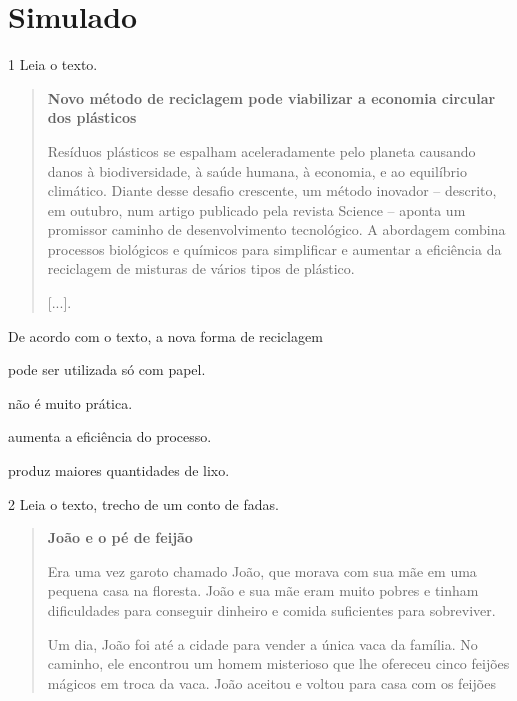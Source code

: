 \pagestyle{simu}
\setcounter{chapter}{0}
\chapter[Simulado 1]{Simulado}

\num{1} Leia o texto.

\begin{quote}
\textbf{Novo método de reciclagem pode viabilizar a economia circular dos plásticos}

Resíduos plásticos se espalham aceleradamente pelo planeta causando
danos à biodiversidade, à saúde humana, à economia, e ao equilíbrio
climático. Diante desse desafio crescente, um método inovador –
descrito, em outubro, num artigo publicado pela revista Science –
aponta um promissor caminho de desenvolvimento tecnológico. A abordagem
combina processos biológicos e químicos para simplificar e aumentar a
eficiência da reciclagem de misturas de vários tipos de plástico.

{[}...{]}.

\end{quote}

De acordo com o texto, a nova forma de reciclagem

\begin{minipage}{.5\textwidth}
\begin{escolha}
\item pode ser utilizada só com papel.

\item não é muito prática.

\item aumenta a eficiência do processo.

\item produz maiores quantidades de lixo.
\end{escolha}
\end{minipage}

\num{2} Leia o texto, trecho de um conto de fadas.

\begin{quote}
\textbf{João e o pé de feijão}

Era uma vez garoto chamado João, que morava com sua mãe em uma pequena
casa na floresta. João e sua mãe eram muito pobres e tinham dificuldades
para conseguir dinheiro e comida suficientes para sobreviver.

Um dia, João foi até a cidade para vender a única vaca da família. No
caminho, ele encontrou um homem misterioso que lhe ofereceu cinco
feijões mágicos em troca da vaca. João aceitou e voltou para casa com os
feijões
\end{quote}

